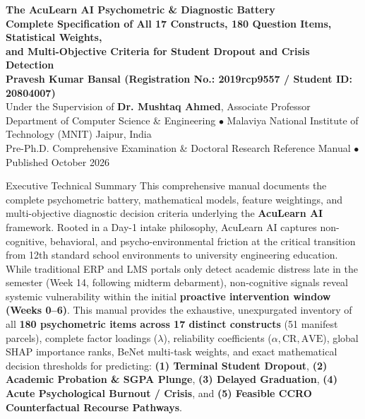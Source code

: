 \documentclass[10pt,a4paper]{article}
\begin{document}
\begin{center}
  {\Huge\bfseries\color{NavyDark} The AcuLearn AI Psychometric \& Diagnostic Battery}\\[0.25cm]
  {\Large\bfseries\color{BluePrimary} Complete Specification of All 17 Constructs, 180 Question Items, Statistical Weights,}\\[0.10cm]
  {\Large\bfseries\color{BluePrimary} and Multi-Objective Criteria for Student Dropout and Crisis Detection}\\[0.30cm]
  {\normalsize\bfseries Pravesh Kumar Bansal (Registration No.: 2019rcp9557 / Student ID: 20804007)}\\[0.08cm]
  {\small Under the Supervision of \textbf{Dr. Mushtaq Ahmed}, Associate Professor}\\[0.08cm]
  {\small Department of Computer Science \& Engineering $\bullet$ Malaviya National Institute of Technology (MNIT) Jaipur, India}\\[0.15cm]
  {\footnotesize\color{TextMuted} Pre-Ph.D. Comprehensive Examination \& Doctoral Research Reference Manual $\bullet$ Published October 2026}
\end{center}

\vspace{-0.2cm}
\begin{summarybox}{Executive Technical Summary}
  This comprehensive manual documents the complete psychometric battery, mathematical models, feature weightings, and multi-objective diagnostic decision criteria underlying the \textbf{AcuLearn AI} framework. 
  Rooted in a Day-1 intake philosophy, AcuLearn AI captures non-cognitive, behavioral, and psycho-environmental friction at the critical transition from 12th standard school environments to university engineering education. 
  While traditional ERP and LMS portals only detect academic distress late in the semester (Week 14, following midterm debarment), non-cognitive signals reveal systemic vulnerability within the initial \textbf{proactive intervention window (Weeks 0--6)}.
  This manual provides the exhaustive, unexpurgated inventory of all \textbf{180 psychometric items across 17 distinct constructs} (51 manifest parcels), complete factor loadings ($\lambda$), reliability coefficients ($\alpha, \text{CR}, \text{AVE}$), global SHAP importance ranks, BeNet multi-task weights, and exact mathematical decision thresholds for predicting:
  \textbf{(1) Terminal Student Dropout}, \textbf{(2) Academic Probation \& SGPA Plunge}, \textbf{(3) Delayed Graduation}, \textbf{(4) Acute Psychological Burnout / Crisis}, and \textbf{(5) Feasible CCRO Counterfactual Recourse Pathways}.
\end{summarybox}
\end{document}
